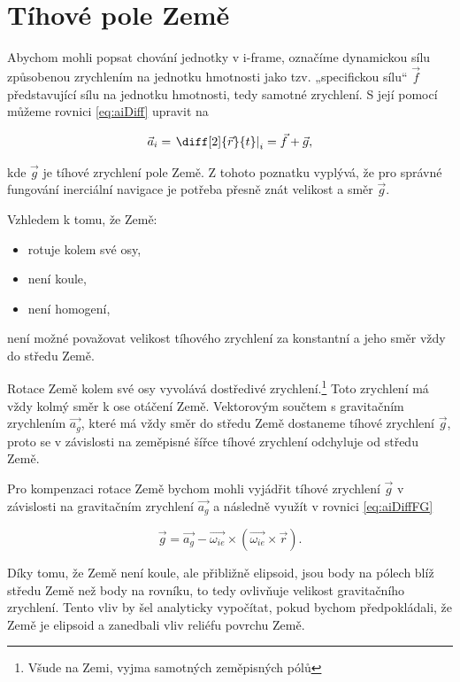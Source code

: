 \section{Tíhové pole Země}
Abychom mohli popsat chování jednotky v i-frame, označíme dynamickou sílu způsobenou zrychlením na jednotku hmotnosti jako tzv. „specifickou sílu“ $ \vec{f} $ představující sílu na jednotku hmotnosti, tedy samotné zrychlení. S její pomocí můžeme rovnici \ref{eq:aiDiff} upravit na \cite{Tittertonc2004} \cite{Grewal2013}

\begin{equation} \label{eq:aiDiffFG}
\vec{a}_{i} = \left. \diff[2]{\vec{r}}{t} \right|_{i} = \vec{f} + \vec{g} ,
\end{equation}

kde $ \vec{g} $ je tíhové zrychlení pole Země.
Z tohoto poznatku vyplývá, že pro správné fungování inerciální navigace je potřeba přesně znát velikost a směr $ \vec{g} $. 

Vzhledem k tomu, že Země: \cite{Halliday2000}
\begin{itemize}
\item rotuje kolem své osy,
\item není koule,
\item není homogení,
\end{itemize}
není možné považovat velikost tíhového zrychlení za konstantní a jeho směr vždy do středu Země.

Rotace Země kolem své osy vyvolává dostředivé zrychlení.\footnote{Všude na Zemi, vyjma samotných zeměpisných pólů}
Toto zrychlení má vždy kolmý směr k ose otáčení Země. Vektorovým součtem s gravitačním zrychlením $ \vec{a_{g}} $, které má vždy směr do středu Země dostaneme tíhové zrychlení $ \vec{g} $, proto se v závislosti na zeměpisné šířce tíhové zrychlení odchyluje od středu Země. \cite{Halliday2000}

Pro kompenzaci rotace Země bychom mohli vyjádřit tíhové zrychlení $ \vec{g} $ v závislosti na gravitačním zrychlení $ \vec{a_{g}} $ a následně využít v rovnici \ref{eq:aiDiffFG} \cite{Tittertonc2004}

\begin{equation} \label{eq:coriolis}
\vec{g}=\vec{a_{g}} - \vec{\omega_{ie}} \times (\vec{\omega_{ie}} \times \vec{r}) .
\end{equation}

Díky tomu, že Země není koule, ale přibližně elipsoid, jsou body na pólech blíž středu Země než body na rovníku, to tedy ovlivňuje velikost gravitačního zrychlení. Tento vliv by šel analyticky vypočítat, pokud bychom předpokládali, že Země je elipsoid a zanedbali vliv reliéfu povrchu Země. \cite{Halliday2000}

